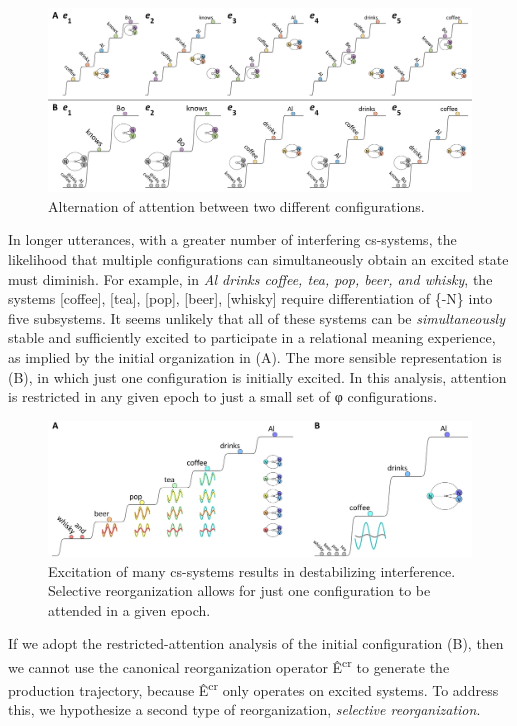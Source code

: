   
\begin{figure}
\includegraphics[width=\textwidth]{figures/Tilsen-img97.png}
\caption{Alternation of attention between two different configurations.}
\label{fig:4:47}
\end{figure}
 

  In longer utterances, with a greater number of interfering cs-systems, the likelihood that multiple configurations can simultaneously obtain an excited state must diminish. For example, in \textit{Al drinks coffee, tea, pop, beer, and whisky}, the systems [coffee], [tea], [pop], [beer], [whisky] require differentiation of \{-N\} into five subsystems. It seems unlikely that all of these systems can be \textit{simultaneously} stable and sufficiently excited to participate in a relational meaning experience, as implied by the initial organization in (A). The more sensible representation is (B), in which just one configuration is initially excited. In this analysis, attention is restricted in any given epoch to just a small set of φ configurations.

  
\begin{figure}
\includegraphics[width=\textwidth]{figures/Tilsen-img98.png}
\caption{Excitation of many cs-systems results in destabilizing interference. Selective reorganization allows for just one configuration to be attended in a given epoch.}
\label{fig:4:48}
\end{figure}
 

  If we adopt the restricted-attention analysis of the initial configuration (B), then we cannot use the canonical reorganization operator Ê\textsuperscript{cr} to generate the production trajectory, because Ê\textsuperscript{cr} only operates on excited systems. To address this, we hypothesize a second type of reorganization, \textit{selective reorganization}.

